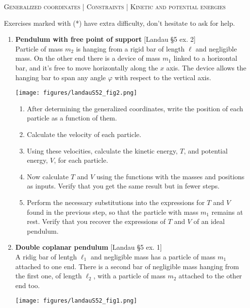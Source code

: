 \documentclass[11pt, a4paper, twoside]{article}
\begin{document}
\begin{center}
  \textsc{\large Generalized coordinates | Constraints | Kinetic and potential energies}
\end{center}
\noindent
Exercises marked with (*) have extra difficulty, don't hesitate to ask for help.

\begin{enumerate}

\item
	\begin{minipage}[t][2.5cm]{0.7\textwidth}
		\textbf{Pendulum with free point of support} [Landau \S5 ex. 2]\\
		Particle of mass $m_2$ is hanging from a rigid bar of length $\ell$ and negligible mass. On the other end there is a device of mass $m_1$ linked to a horizontal bar, and it's free to move horizontally along the $x$ axis. The device allows the hanging bar to span any angle $\varphi$ with respect to the vertical axis. 
	\end{minipage}
	\begin{minipage}[c][2cm][t]{0.3\textwidth}
		\texttt{[image: figures/landauS52\_fig2.png]}
	\end{minipage}
	\begin{enumerate}
		\item After determining the generalized coordinates, write the position of each particle as a function of them.
		\item Calculate the velocity of each particle.
		\item Using these velocities, calculate the kinetic energy, $T$, and potential energy, $V$, for each particle.
		\item Now calculate $T$ and $V$ using the functions with the masses and positions as inputs. Verify that you get the same result but in fewer steps.		
		\item Perform the necessary substitutions into the expressions for $T$ and $V$ found in the previous step, so that the particle with mass $m_1$ remains at rest. Verify that you recover the expressions of $T$ and $V$ of an ideal pendulum.
	\end{enumerate}



\item
	\begin{minipage}[t][3.7cm]{0.7\textwidth}
		\textbf{Double coplanar pendulum} [Landau \S5 ex. 1]\\
		A ridig bar of lentgh $\ell_1$ and negligible mass has a particle of mass $m_1$ attached to one end. There is a second bar of negligible mass hanging from the first one, of length $\ell_2$, with a particle of mass $m_2$ attached to the other end too.		
	\end{minipage}
	\begin{minipage}[c][2cm][t]{0.3\textwidth}
		\texttt{[image: figures/landauS52\_fig1.png]}
	\end{minipage}


\end{enumerate}
\end{document}
